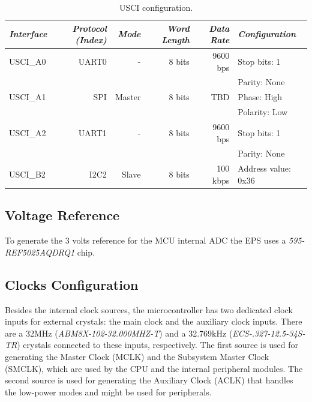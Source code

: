 \begin{table}[!h]
    \centering
    \begin{tabular}{lrrrrl}
        \toprule[1.5pt]
        \textit{Interface} & \textit{Protocol (Index)} & \textit{Mode} & \textit{Word Length} & \textit{Data Rate} & \textit{Configuration} \\
        \midrule
        USCI\_A0           & UART0                     & -             & 8 bits               & 9600 bps           & Stop bits: 1 \\
                           &                           &               &                      &                    & Parity: None \\
        USCI\_A1           & SPI                       & Master        & 8 bits               & TBD                & Phase: High \\
                           &                           &               &                      &                    & Polarity: Low \\
        USCI\_A2           & UART1                     & -             & 8 bits               & 9600 bps           & Stop bits: 1 \\
                           &                           &               &                      &                    & Parity: None \\
        USCI\_B2           & I2C2                      & Slave         & 8 bits               & 100 kbps           & Address value: 0x36 \\
        \bottomrule[1.5pt]
    \end{tabular}
    \caption{USCI configuration.}
    \label{tab:usci-config}
\end{table}

\subsection{Voltage Reference}

To generate the 3 volts reference for the MCU internal ADC the EPS uses a \textit{595-REF5025AQDRQ1} chip.

\subsection{Clocks Configuration}

Besides the internal clock sources, the microcontroller has two dedicated clock inputs for external crystals: the main clock and the auxiliary clock inputs. There are a 32MHz (\textit{ABM8X-102-32.000MHZ-T}) and a 32.769kHz (\textit{ECS-.327-12.5-34S-TR}) crystals connected to these inputs, respectively. The first source is used for generating the Master Clock (MCLK) and the Subsystem Master Clock (SMCLK), which are used by the CPU and the internal peripheral modules. The second source is used for generating the Auxiliary Clock (ACLK) that handles the low-power modes and might be used for peripherals.


